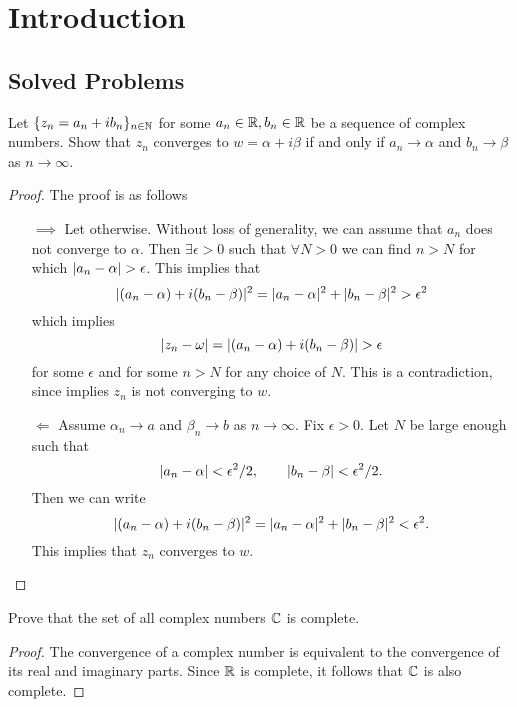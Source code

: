 \chapter{Introduction}


\section{Solved Problems}

\begin{problem}
	Let $ \{z_n = a_n + i b_n\}_{n\in\mathbb{N}} $ for some $ a_n \in \mathbb{R}, b_n \in \mathbb{R} $  be a sequence of complex numbers. Show that $ z_n $ converges to $ w = \alpha + i\beta $ if and only if $ a_n \to \alpha $ and $ b_n \to \beta $ as $ n\to \infty $.
\end{problem}

\begin{proof}
	The proof is as follows
	\begin{itemize}
		\item[$\boxed{ \implies }$] Let otherwise. Without loss of generality, we can assume that $ a_n $ does not converge to $ \alpha $. Then $ \exists \epsilon>0 $ such that $ \forall N>0 $ we can find $ n>N $ for which $ |a_n - \alpha| > \epsilon $. This implies that
		\[ |(a_n - \alpha) + i(b_n - \beta)|^2 = |a_n-\alpha|^2 + |b_n - \beta|^2  > \epsilon^2 \]
		which implies
		\[ |z_n - \omega|=|(a_n - \alpha) + i(b_n - \beta)| > \epsilon \]
		for some $ \epsilon $ and for some $ n>N $ for any choice of $ N $. This is a contradiction, since implies $ z_n $ is not converging to $ w $.
		\item[$ \boxed{\Longleftarrow} $] Assume $ \alpha_n \to a $ and $ \beta_n \to b $ as $ n\to \infty $. Fix $ \epsilon>0 $. Let $ N $ be large enough such that 
		\[ |a_n - \alpha|< \epsilon^2/2, \qquad |b_n - \beta|< \epsilon^2/2. \]
		Then we can write
		\[ |(a_n-\alpha) + i(b_n - \beta)|^2 = |a_n-\alpha|^2 + |b_n - \beta|^2 < \epsilon^2. \]
		This implies that $ z_n $ converges to $ w $.
	\end{itemize}
\end{proof}

\begin{problem}[Completeness of $ \C $]
	Prove that the set of all complex numbers $ \C $ is complete.
\end{problem}
\begin{proof}
	The convergence of a complex number is equivalent to the convergence of its real and imaginary parts. Since $ \mathbb{R} $ is complete, it follows that $ \C $ is also complete.
\end{proof}